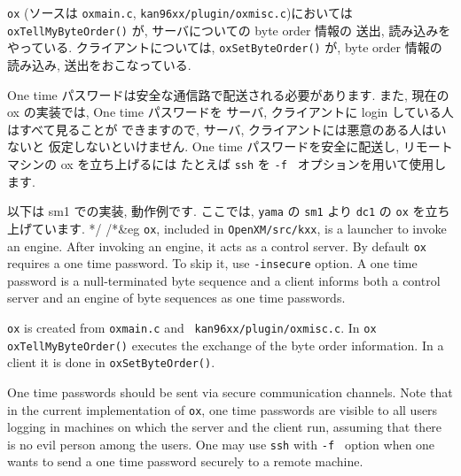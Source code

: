 {\tt ox} (ソースは {\tt oxmain.c}, {\tt kan96xx/plugin/oxmisc.c})においては
{\tt oxTellMyByteOrder()} が, サーバについての byte order 情報の
送出, 読み込みをやっている.
クライアントについては,
{\tt oxSetByteOrder()} が, byte order 情報の読み込み, 送出をおこなっている.

One time パスワードは安全な通信路で配送される必要があります.
また, 現在の {\rm ox} の実装では, One time パスワードを
サーバ, クライアントに login している人はすべて見ることが
できますので, サーバ, クライアントには悪意のある人はいないと
仮定しないといけません.
One time パスワードを安全に配送し, リモートマシンの {\rm ox}
を立ち上げるには
たとえば 
{\tt ssh} を {\tt -f } オプションを用いて使用します.

以下は {\rm sm1} での実装, 動作例です.
ここでは, {\tt yama} の {\tt sm1} より {\tt dc1} の {\tt ox} 
を立ち上げています.
*/
/*&eg
\noindent
{\tt ox}, included in {\tt OpenXM/src/kxx}, 
is a launcher to invoke an engine. After invoking an
engine, it acts as a control server. By default {\tt ox} requires
a one time password. To skip it, use {\tt -insecure} option.
A one time password is a null-terminated byte sequence and
a client informs both a control server and an engine of
byte sequences as one time passwords.

{\tt ox} is created from {\tt oxmain.c} and {\tt
kan96xx/plugin/oxmisc.c}.  In {\tt ox} \\
{\tt oxTellMyByteOrder()}
executes the exchange of the byte order information. In a client it is
done in {\tt oxSetByteOrder()}.

One time passwords should be sent via secure communication channels.
Note that in the current implementation of {\tt ox}, one time passwords
are visible to all users logging in machines on which the server
and the client run, assuming that there is no evil person among the users.
One may use {\tt ssh} with {\tt -f } option when one wants to send 
a one time password securely to a remote machine.

